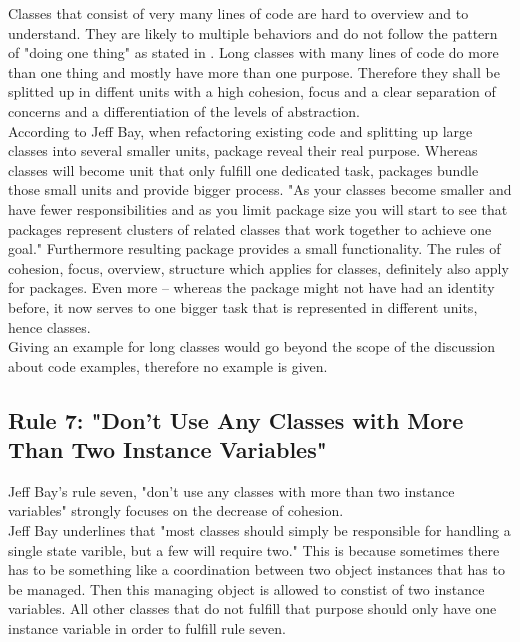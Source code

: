 Classes that consist of very many lines of code are hard to overview and to understand. They are likely to multiple behaviors and do not follow the pattern of "doing one thing" as stated in \cite{cc}. Long classes with many lines of code do more than one thing and mostly have more than one purpose. Therefore they shall be splitted up in diffent units with a high cohesion, focus and a clear separation of concerns and a differentiation of the levels of abstraction. 
\\

According to Jeff Bay, when refactoring existing code and splitting up large classes into several smaller units, package reveal their real purpose. Whereas classes will become unit that only fulfill one dedicated task, packages bundle those small units and provide bigger process. "As your classes become smaller and have fewer responsibilities and as you limit package size you will start to see that packages represent clusters of related classes that work together to achieve one goal." \cite{oc2008} Furthermore resulting package provides a small functionality. The rules of cohesion, focus, overview, structure which applies for classes, definitely also apply for packages. Even more -- whereas the package might not have had an identity before, it now serves to one bigger task that is represented in different units, hence classes. 
\\

Giving an example for long classes would go beyond the scope of the discussion about code examples, therefore no example is given.


\subsection*{Rule 7: "Don’t Use Any Classes with More Than Two Instance Variables"}
Jeff Bay's rule seven, "don't use any classes with more than two instance variables" strongly focuses on the decrease of cohesion.
\\

Jeff Bay underlines that "most classes should simply be responsible for handling a single state varible, but a few will require two." \cite{oc2008} This is because sometimes there has to be something like a coordination between two object instances that has to be managed. Then this managing object is allowed to constist of two instance variables. All other classes that do not fulfill that purpose should only have one instance variable in order to fulfill rule seven.
\\

